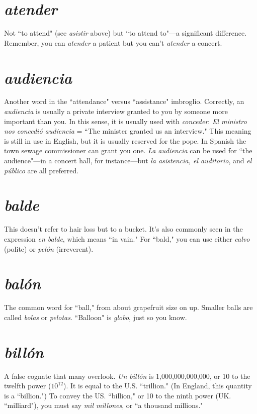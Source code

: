\section{\emph{atender}}

Not ``to attend" (see \emph{asistir} above) but ``to attend
to"---a significant difference. Remember, you can \emph{atender} a patient but you can't \emph{atender} a concert.

\section{\emph{audiencia}}

Another word in the ``attendance" versus ``assistance" imbroglio. Correctly, an \emph{audiencia} is usually a private interview granted to you by someone more important than you. In this
sense, it is usually used with \emph{conceder}: \emph{El ministro nos concedió audiencia} = ``The minister granted us an interview." This meaning is
still in use in English, but it is usually reserved for the pope. In Spanish the town sewage commissioner can grant you one. \emph{La audiencia}
can be used for ``the audience"---in a concert hall, for instance---but \emph{la
	asistencia, el auditorio}, and \emph{el público} are all preferred.

\section{\emph{balde}}

This doesn't refer to hair loss but to a bucket. It's also
commonly seen in the expression \emph{en balde}, which means ``in vain."
For ``bald," you can use either \emph{calvo} (polite) or \emph{pelón} (irreverent).

\section{\emph{balón}}

The common word for ``ball," from about grapefruit
size on up. Smaller balls are called \emph{bolas} or \emph{pelotas}. ``Balloon" is
\emph{globo}, just so you know.

\section{\emph{billón}}

A false cognate that many overlook. \emph{Un billón} is
1,000,000,000,000, or 10 to the twelfth power ($10^{12}$). It is equal to the
U.S. ``trillion." (In England, this quantity is a ``billion.") To convey the
US. ``billion," or 10 to the ninth power (UK. ``milliard"), you must say
\emph{mil millones}, or ``a thousand millions."

